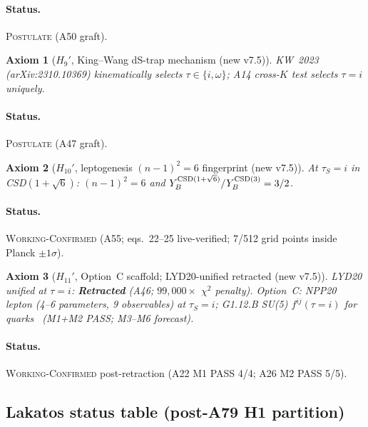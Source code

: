\documentclass[a4paper,11pt]{article}
\newtheorem*{axiom*}{Axiom}
\theoremstyle{definition}
\theoremstyle{remark}
\begin{document}
\paragraph{Status.}  \textsc{Postulate} (A50 graft).

\begin{axiom*}[$H_9'$, King--Wang dS-trap mechanism (new v7.5)]
KW~2023~\cite{KW23} (arXiv:2310.10369) kinematically selects
$\tau\in\{i,\omega\}$; A14 cross-$K$ test selects $\tau=i$ uniquely.
\end{axiom*}

\paragraph{Status.}  \textsc{Postulate} (A47 graft).

\begin{axiom*}[$H_{10}'$, leptogenesis $(n-1)^2=6$ fingerprint (new v7.5)]
At $\tau_S=i$ in CSD$(1+\sqrt 6)$: $(n-1)^2=6$ and
$Y_B^{\rm CSD(1+\sqrt 6)}/Y_B^{\rm CSD(3)}=3/2$.
\end{axiom*}

\paragraph{Status.}  \textsc{Working-Confirmed} (A55; \cite{KMSR18}
eqs.~22--25 live-verified; 7/512 grid points inside Planck $\pm1\sigma$).

\begin{axiom*}[$H_{11}'$, Option~C scaffold; LYD20-unified retracted (new v7.5)]
LYD20 unified at $\tau=i$: \textbf{Retracted} (A46;
$99{,}000\times$ $\chi^2$ penalty).
Option~C: NPP20~\cite{NPP20} lepton (4--6 parameters, 9 observables)
at $\tau_S=i$; G1.12.B SU(5) $f^{ij}(\tau=i)$ for
quarks~\cite{A18scoping} (M1+M2 PASS; M3--M6 forecast).
\end{axiom*}

\paragraph{Status.}  \textsc{Working-Confirmed} post-retraction
(A22 M1 PASS 4/4; A26 M2 PASS 5/5).

\subsection{Lakatos status table (post-A79 H1 partition)}
\label{sec:axioms-lakatos}
\end{document}
